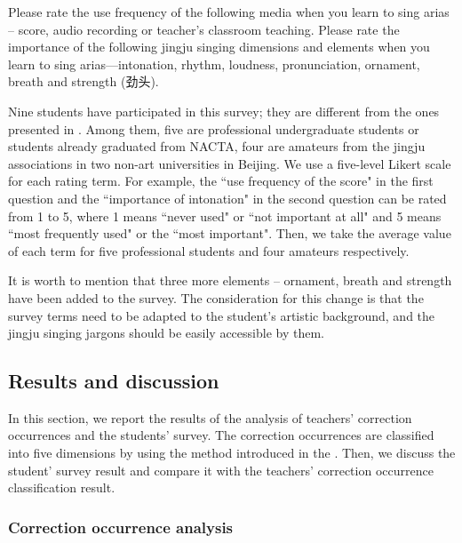 Please rate the use frequency of the following media when you learn to sing arias -- score, audio recording or teacher's classroom teaching. 
Please rate the importance of the following jingju singing dimensions and elements when you learn to sing arias—intonation, rhythm, loudness, pronunciation, ornament, breath and strength (劲头). 

Nine students have participated in this survey; they are different from the ones presented in . Among them, five are professional undergraduate students or students already graduated from \gls{NACTA}, four are amateurs from the jingju associations in two non-art universities in Beijing. We use a five-level Likert scale for each rating term. For example, the ``use frequency of the score" in the first question and the ``importance of intonation" in the second question can be rated from 1 to 5, where 1 means ``never used" or ``not important at all" and 5 means ``most frequently used" or the ``most important". Then, we take the average value of each term for five professional students and four amateurs respectively. 

It is worth to mention that three more elements -- ornament, breath and strength have been added to the survey. The consideration for this change is that the survey terms need to be adapted to the student's artistic background, and the jingju singing jargons should be easily accessible by them.

\subsection{Results and discussion}

In this section, we report the results of the analysis of teachers' correction occurrences and the students' survey. The correction occurrences are classified into five dimensions by using the method introduced in the . Then, we discuss the student' survey result and compare it with the teachers' correction occurrence classification result.

\subsubsection{Correction occurrence analysis}\label{sec:ch3:correction_occurrence_results}

